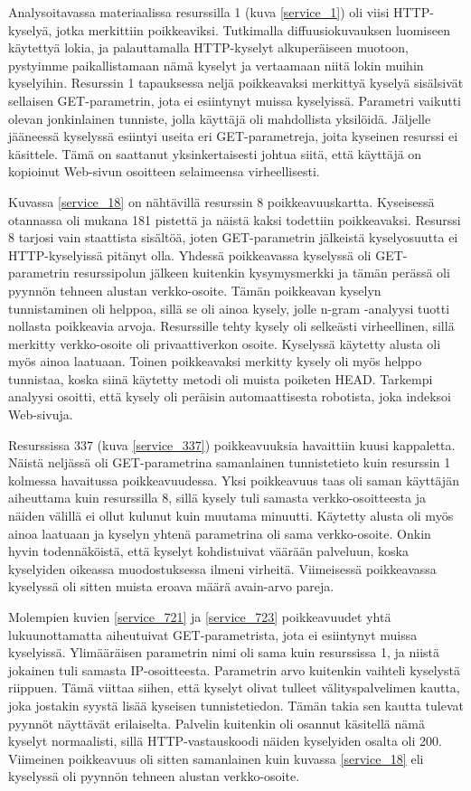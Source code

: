 Analysoitavassa materiaalissa resurssilla 1 (kuva \ref{service_1}) oli
viisi HTTP-kyselyä, jotka merkittiin poikkeaviksi. Tutkimalla
diffuusiokuvauksen luomiseen käytettyä lokia, ja palauttamalla
HTTP-kyselyt alkuperäiseen muotoon, pystyimme paikallistamaan nämä
kyselyt ja vertaamaan niitä lokin muihin kyselyihin. Resurssin 1
tapauksessa neljä poikkeavaksi merkittyä kyselyä sisälsivät sellaisen
GET-parametrin, jota ei esiintynyt muissa kyselyissä. Parametri
vaikutti olevan jonkinlainen tunniste, jolla käyttäjä oli mahdollista
yksilöidä. Jäljelle jääneessä kyselyssä esiintyi useita eri
GET-parametreja, joita kyseinen resurssi ei käsittele. Tämä on
saattanut yksinkertaisesti johtua siitä, että käyttäjä on kopioinut
Web-sivun osoitteen selaimeensa virheellisesti.

Kuvassa \ref{service_18} on nähtävillä resurssin 8 poikkeavuuskartta. Kyseisessä otannassa oli mukana 181 pistettä ja näistä kaksi todettiin poikkeavaksi.
Resurssi 8 tarjosi vain staattista sisältöä, joten GET-parametrin jälkeistä kyselyosuutta ei HTTP-kyselyissä pitänyt olla. Yhdessä poikkeavassa kyselyssä oli
GET-parametrin resurssipolun jälkeen kuitenkin kysymysmerkki ja tämän perässä oli pyynnön tehneen alustan verkko-osoite. Tämän poikkeavan kyselyn tunnistaminen
oli helppoa, sillä se oli ainoa kysely, jolle n-gram -analyysi tuotti
nollasta poikkeavia arvoja. Resurssille tehty kysely oli selkeästi virheellinen, sillä merkitty verkko-osoite 
oli privaattiverkon osoite. Kyselyssä käytetty alusta oli myös ainoa laatuaan. Toinen poikkeavaksi merkitty kysely oli myös helppo tunnistaa, koska siinä 
käytetty metodi oli muista poiketen HEAD. Tarkempi analyysi osoitti, että kysely oli peräisin automaattisesta robotista, joka indeksoi Web-sivuja. 

Resurssissa 337 (kuva \ref{service_337}) poikkeavuuksia havaittiin kuusi kappaletta. Näistä neljässä oli GET-parametrina samanlainen tunnistetieto
kuin resurssin 1 kolmessa havaitussa poikkeavuudessa. Yksi poikkeavuus taas oli saman käyttäjän aiheuttama kuin resurssilla 8, sillä kysely tuli samasta
verkko-osoitteesta ja näiden välillä ei ollut kulunut kuin muutama
minuutti. Käytetty alusta oli myös ainoa laatuaan ja kyselyn yhtenä parametrina oli 
sama verkko-osoite. Onkin hyvin todennäköistä, että kyselyt
kohdistuivat väärään palveluun, koska kyselyiden oikeassa muodostuksessa ilmeni
virheitä. Viimeisessä poikkeavassa kyselyssä oli sitten muista eroava määrä avain-arvo pareja.

Molempien kuvien \ref{service_721} ja \ref{service_723} poikkeavuudet yhtä lukuunottamatta
aiheutuivat GET-parametrista, jota ei esiintynyt muissa
kyselyissä. Ylimääräisen parametrin nimi oli sama kuin resurssissa 1,
ja niistä jokainen tuli samasta IP-osoitteesta. Parametrin arvo
kuitenkin vaihteli kyselystä riippuen. Tämä viittaa siihen, että
kyselyt olivat tulleet välityspalvelimen kautta, joka jostakin syystä
lisää kyseisen tunnistetiedon. Tämän takia sen kautta tulevat pyynnöt
näyttävät erilaiselta. Palvelin kuitenkin oli osannut käsitellä nämä
kyselyt normaalisti, sillä HTTP-\-vastauskoodi näiden kyselyiden
osalta oli 200. Viimeinen poikkeavuus oli sitten samanlainen kuin kuvassa \ref{service_18} eli kyselyssä oli pyynnön tehneen alustan verkko-osoite.

